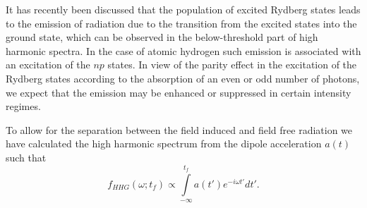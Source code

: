 It has recently been discussed \cite{chini14,camp15,beaulieu16} that the population of excited Rydberg states leads to the emission of radiation due to the transition from the excited states into the ground state, which can be observed in the below-threshold part of high harmonic spectra. In the case of atomic hydrogen such emission is associated with an excitation of the $np$ states. In view of the parity effect in the excitation of the Rydberg states according to the absorption of an even or odd number of photons, we expect that the emission may be enhanced or suppressed in certain intensity regimes.

To allow for the separation between the field induced and field free radiation we have calculated the high harmonic spectrum from the dipole acceleration $a(t)$ such that
%
\begin{equation}
f_{HHG}(\omega; t_f)  \propto \int\limits_{-\infty}^{t_f}  a(t') e^{-i\omega t'} dt'.
\end{equation}

